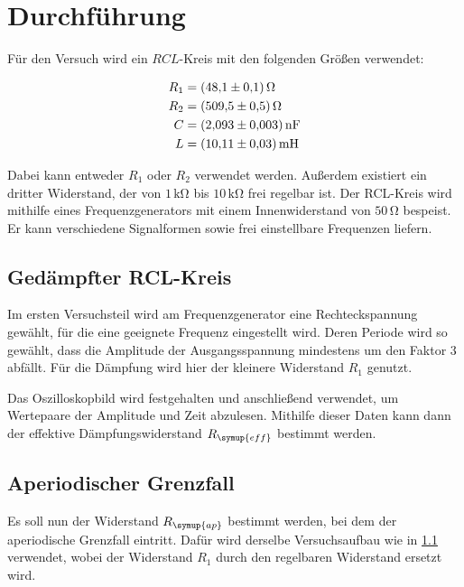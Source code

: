 \section{Durchführung}
\label{sec:Durchführung}

Für den Versuch wird ein $RCL$-Kreis mit den folgenden Größen verwendet:

\begin{align*}
    R_{1} &= \qty{48.1+-0.1}{\ohm} \\ \notag
    R_{2} &= \qty{509.5+-0.5}{\ohm} \\ \notag
    C &= \qty{2.093+-0.003}{\nano\farad} \\ \notag
    L &= \qty{10.11+-0.03}{\milli\henry} \notag
\end{align*}

Dabei kann entweder $R_{1}$ oder $R_{2}$ verwendet werden.
Außerdem existiert ein dritter Widerstand, der von $1\,\unit{\kilo\ohm}$ bis $10\,\unit{\kilo\ohm}$ frei regelbar ist.
Der RCL-Kreis wird mithilfe eines Frequenzgenerators mit einem Innenwiderstand von $50\,\unit{\ohm}$ bespeist.
Er kann verschiedene Signalformen sowie frei einstellbare Frequenzen liefern.

\subsection{Gedämpfter RCL-Kreis}
\label{sec:Gedämpfter RCL-Kreis}

Im ersten Versuchsteil wird am Frequenzgenerator eine Rechteckspannung gewählt, für die eine geeignete Frequenz eingestellt wird.
Deren Periode wird so gewählt, dass die Amplitude der Ausgangsspannung
mindestens um den Faktor 3 abfällt.
Für die Dämpfung wird hier der kleinere Widerstand $R_{1}$ genutzt.

Das Oszilloskopbild wird festgehalten und anschließend verwendet, um Wertepaare der Amplitude und Zeit abzulesen.
Mithilfe dieser Daten kann dann der effektive Dämpfungswiderstand $R_{\symup{eff}}$ bestimmt werden.

\subsection{Aperiodischer Grenzfall}
\label{sec:Aperiodischer Grenzfall Durchführung}

Es soll nun der Widerstand $R_{\symup{ap}}$ bestimmt werden, bei dem der aperiodische Grenzfall eintritt.
Dafür wird derselbe Versuchsaufbau wie in \ref{sec:Gedämpfter RCL-Kreis} verwendet, wobei der Widerstand $R_{1}$
durch den regelbaren Widerstand ersetzt wird.

